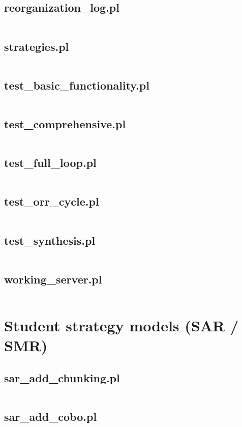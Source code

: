 \documentclass{article}
\begin{document}
\subsection{reorganization\_log.pl}
\inputminted{prolog}{reorganization_log.pl}
\subsection{strategies.pl}
\inputminted{prolog}{strategies.pl}
\subsection{test\_basic\_functionality.pl}
\inputminted{prolog}{test_basic_functionality.pl}
\subsection{test\_comprehensive.pl}
\inputminted{prolog}{test_comprehensive.pl}
\subsection{test\_full\_loop.pl}
\inputminted{prolog}{test_full_loop.pl}
\subsection{test\_orr\_cycle.pl}
\inputminted{prolog}{test_orr_cycle.pl}
\subsection{test\_synthesis.pl}
\inputminted{prolog}{test_synthesis.pl}
\subsection{working\_server.pl}
\inputminted{prolog}{working_server.pl}

\section{Student strategy models (SAR / SMR)}
\subsection{sar\_add\_chunking.pl}
\inputminted{prolog}{sar_add_chunking.pl}
\subsection{sar\_add\_cobo.pl}
\inputminted{prolog}{sar_add_cobo.pl}
\end{document}
